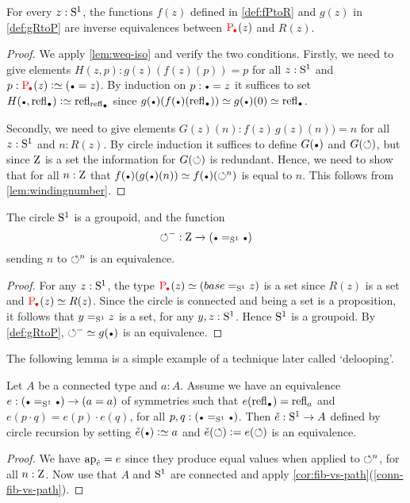 \begin{lemma}
  \label{lem:univisexp}
For every $z:{\mathrm{S}^1}$, the functions $f(z)$ defined in \cref{def:fPtoR} 
and $g(z)$ in \cref{def:gRtoP} are inverse equivalences between
$\uc{\base}(z)$ and $R(z)$.
\end{lemma}
\begin{proof}
We apply \cref{lem:weq-iso} and verify the two conditions.
  Firstly, we need to give elements $H(z,p):g(z)(f(z)(p))=p$
for all $z:{\mathrm{S}^1}$ and $p:\uc{\base}(z)\defeq(\base=z)$. 
By induction on $p:\base=z$ it suffices to set 
$H(\base,\refl\base)\defeq\refl{\refl{\base}}$ since
$g(\base)(f(\base)(\refl{\base}))\jdeq g(\base)(0)\jdeq\refl{\base}$.

Secondly, we need to give elements $G(z)(n):f(z)\,g(z)(n))=n$
for all $z:{\mathrm{S}^1}$ and $n: R(z)$.
By circle induction it suffices to define $G(\base)$ and $G(\circlearrowleft)$,
but since $\mathrm{Z}$ is a set the information for $G(\circlearrowleft)$ is redundant.
Hence, we need to show that for all $n:\mathrm{Z}$ that 
$f(\base)(g(\base)(n))\jdeq  f(\base)(\Sloop^n)$ is equal to $n$.  
This follows from \cref{lem:windingnumber}. 
\end{proof}


\begin{corollary}\label{cor:S1groupoid}
The circle ${\mathrm{S}^1}$ is a groupoid, and the function
\[
{\Sloop}^{-} : \zet\to(\base=_{\Sc}\base)
\]
sending $n$ to $\circlearrowleft^n$ is an equivalence.
\end{corollary}
\begin{proof}
For any $z:{\mathrm{S}^1}$, the type $\uc{\base}(z)\jdeq (base=_{\Sc}z)$ is a set 
since $R(z)$ is a set and $\uc{\base}(z) \equiv R(z)$.
Since the circle is connected and being a set is a proposition, it follows
that $y=_{{\mathrm{S}^1}}z$ is a set, for any $y,z:{\mathrm{S}^1}$. Hence ${\mathrm{S}^1}$ is a groupoid.
By \cref{def:gRtoP}, ${\Sloop}^{-}\jdeq g(\base)$ is an equivalence.
\end{proof}

The following lemma is a simple example of a technique later called `delooping'.
\begin{lemma}\label{lem:S1-delooping}
Let $A$ be a connected type and $a:A$. 
Assume we have an equivalence $e:(\base=_{\Sc}\base) \to (a=a)$
of symmetries such that $e(\refl{\base})=\refl{a}$
and $e(p\cdot q)=e(p)\cdot e(q)$, for all $p,q:(\base=_{\Sc}\base)$.
Then $\check e : {\mathrm{S}^1}\to A$ defined by circle recursion by setting
$\check e(\base)\defeq a$ and $\check e(\circlearrowleft)\mathrel{\vcentcolon=} e(\circlearrowleft)$
is an equivalence.
\end{lemma}
\begin{proof}
We have $\ap{\check e} = e$ since they produce equal values when applied
to $\circlearrowleft^n$, for all $n:\mathrm{Z}$. Now use that $A$ and ${\mathrm{S}^1}$ are connected and
apply \cref{cor:fib-vs-path}(\ref{conn-fib-vs-path}).
\end{proof}

